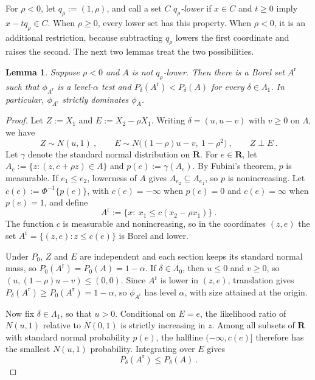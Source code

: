 \documentclass[11pt]{article}
\numberwithin{equation}{section}
\newtheorem{lemma}{Lemma}
\theoremstyle{definition}
\begin{document}
For $\rho<0$, let $q_\rho:=(1,\rho)$, and call a set $C$ \emph{$q_\rho$-lower} if $x\in C$ and $t\ge0$ imply $x-tq_\rho\in C$. When $\rho\ge0$, every lower set has this property. When $\rho<0$, it is an additional restriction, because subtracting $q_\rho$ lowers the first coordinate and raises the second. The next two lemmas treat the two possibilities.

\begin{lemma}\label{lem:bv-rearrangement}
Suppose $\rho<0$ and $A$ is not $q_\rho$-lower. Then there is a Borel set $A^{\mathrm r}$ such that $\phi_{A^{\mathrm r}}$ is a level-$\alpha$ test and $P_\delta(A^{\mathrm r})<P_\delta(A)$ for every $\delta\in\Lambda_1$. In particular, $\phi_{A^{\mathrm r}}$ strictly dominates $\phi_A$.
\end{lemma}

\begin{proof}
Let $Z:=X_1$ and $E:=X_2-\rho X_1$. Writing $\delta=(u,u-v)$ with $v\ge0$ on $\Lambda$, we have
\[
Z\sim N(u,1)~,
\qquad
E\sim N\big((1-\rho)u-v,\ 1-\rho^2\big)~,
\qquad
Z\perp E~.
\]
Let $\gamma$ denote the standard normal distribution on $\mathbf R$. For $e\in\mathbf R$, let $A_e:=\{z:(z,e+\rho z)\in A\}$ and $p(e):=\gamma(A_e)$. By Fubini's theorem, $p$ is measurable. If $e_1\le e_2$, lowerness of $A$ gives $A_{e_2}\subseteq A_{e_1}$, so $p$ is nonincreasing. Let $c(e):=\Phi^{-1}\{p(e)\}$, with $c(e)=-\infty$ when $p(e)=0$ and $c(e)=\infty$ when $p(e)=1$, and define
\[
A^{\mathrm r}:=\{x:\ x_1\le c(x_2-\rho x_1)\}~.
\]
The function $c$ is measurable and nonincreasing, so in the coordinates $(z,e)$ the set $A^{\mathrm r}=\{(z,e):z\le c(e)\}$ is Borel and lower.

Under $P_0$, $Z$ and $E$ are independent and each section keeps its standard normal mass, so $P_0(A^{\mathrm r})=P_0(A)=1-\alpha$. If $\delta\in\Lambda_0$, then $u\le0$ and $v\ge0$, so $(u,(1-\rho)u-v)\le(0,0)$. Since $A^{\mathrm r}$ is lower in $(z,e)$, translation gives $P_\delta(A^{\mathrm r})\ge P_0(A^{\mathrm r})=1-\alpha$, so $\phi_{A^{\mathrm r}}$ has level $\alpha$, with size attained at the origin.

Now fix $\delta\in\Lambda_1$, so that $u>0$. Conditional on $E=e$, the likelihood ratio of $N(u,1)$ relative to $N(0,1)$ is strictly increasing in $z$. Among all subsets of $\mathbf R$ with standard normal probability $p(e)$, the halfline $(-\infty,c(e)]$ therefore has the smallest $N(u,1)$ probability. Integrating over $E$ gives
\begin{equation}\label{eq:bv-weak-rearrangement}
P_\delta(A^{\mathrm r})\le P_\delta(A)~.
\end{equation}


\end{proof}
\end{document}
